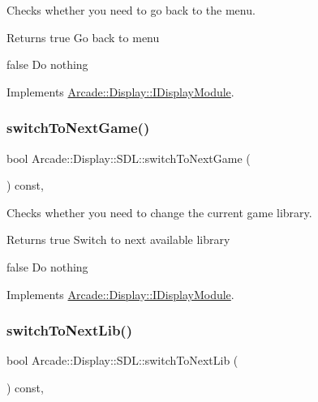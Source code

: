 Checks whether you need to go back to the menu. 

\begin{DoxyReturn}{Returns}
true Go back to menu 

false Do nothing 
\end{DoxyReturn}


Implements \mbox{\hyperlink{classArcade_1_1Display_1_1IDisplayModule_ad060f6b99f2adffaf02a4226fc40d0ab}{Arcade\+::\+Display\+::\+I\+Display\+Module}}.

\mbox{\label{classArcade_1_1Display_1_1SDL_a3f197b6ea176410b4eb472d7e848eb10}} 
\subsubsection{\texorpdfstring{switchToNextGame()}{switchToNextGame()}}
{\footnotesize\ttfamily bool Arcade\+::\+Display\+::\+S\+D\+L\+::switch\+To\+Next\+Game (\begin{DoxyParamCaption}{ }\end{DoxyParamCaption}) const\hspace{0.3cm}{\ttfamily [final]}, {\ttfamily [virtual]}}



Checks whether you need to change the current game library. 

\begin{DoxyReturn}{Returns}
true Switch to next available library 

false Do nothing 
\end{DoxyReturn}


Implements \mbox{\hyperlink{classArcade_1_1Display_1_1IDisplayModule_a9584cb0ca3b157c9a4ec94509e4f8e32}{Arcade\+::\+Display\+::\+I\+Display\+Module}}.

\mbox{\label{classArcade_1_1Display_1_1SDL_a91bee5a87dfcacb4da9d6d148dc52a2b}} 
\subsubsection{\texorpdfstring{switchToNextLib()}{switchToNextLib()}}
{\footnotesize\ttfamily bool Arcade\+::\+Display\+::\+S\+D\+L\+::switch\+To\+Next\+Lib (\begin{DoxyParamCaption}{ }\end{DoxyParamCaption}) const\hspace{0.3cm}{\ttfamily [final]}, {\ttfamily [virtual]}}



